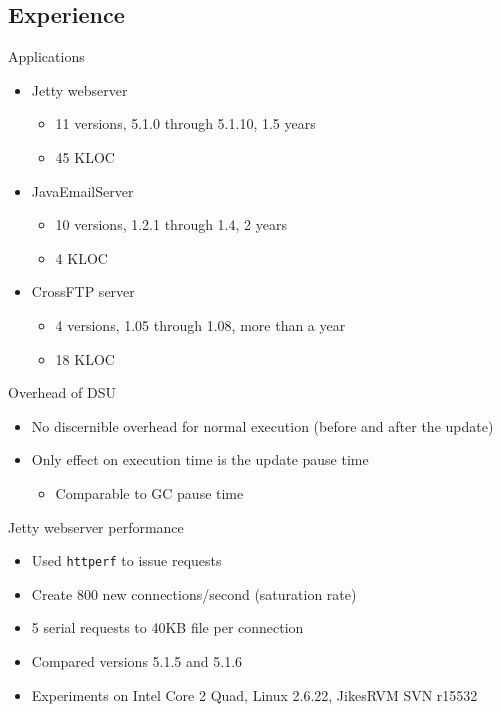
\subsection{Experience}
\ShowTOC

\newcommand{\HighlightRow}{\rowcolor{structure.fg!30}}

\begin{frame}{Applications}%
\begin{itemize}
\item Jetty webserver
  \begin{itemize}
  \item 11 versions, 5.1.0 through 5.1.10, 1.5 years
  \item 45 KLOC
  \end{itemize}
\item JavaEmailServer
  \begin{itemize}
  \item 10 versions, 1.2.1 through 1.4, 2 years
  \item 4 KLOC
  \end{itemize}
\item CrossFTP server
  \begin{itemize}
  \item 4 versions, 1.05 through 1.08, more than a year
  \item 18 KLOC
  \end{itemize}
\end{itemize}
\end{frame}

\begin{frame}{Overhead of DSU}%
\begin{itemize}
\item No discernible overhead for normal execution (before and after the
update)
\item Only effect on execution time is the update pause time
  \begin{itemize}
  \item Comparable to GC pause time
  \end{itemize}
\end{itemize}
\end{frame}

\begin{frame}{Jetty webserver performance}%
\begin{itemize}
\item Used \texttt{httperf} to issue requests
\item Create 800 new connections/second (saturation rate)
\item 5 serial requests to 40KB file per connection
\item Compared versions 5.1.5 and 5.1.6
\item Experiments on Intel Core 2 Quad, Linux 2.6.22, JikesRVM SVN r15532
\end{itemize}
\end{frame}

